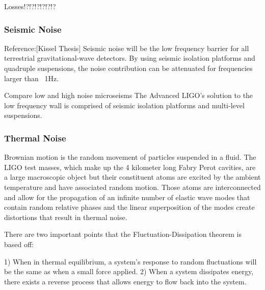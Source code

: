 		Losses!?!?!?!?!?!?
		
		\subsubsection{Seismic Noise}
		Reference:[Kissel Thesis]
		Seismic noise will be the low frequency barrier for all terrestrial gravitational-wave detectors.  By using seismic isolation platforms and quadruple suspensions, the noise contribution can be attenuated for frequencies larger than ~1Hz.
		
		Compare low and high noise microseisms
		\cite{BlairBook}
		The Advanced LIGO's solution to the low frequency wall is comprised of seismic isolation platforms and multi-level suspensions.
		
		\subsubsection{Thermal Noise}
		Brownian motion \cite{brownian_einstein} is the random movement of particles suspended in a fluid.  The LIGO test masses, which make up the 4 kilometer long Fabry Perot cavities, are a large macroscopic object but their constituent atoms are excited by the ambient temperature and have associated random motion. Those atoms are interconnected and allow for the propagation of an infinite number of elastic wave modes that contain random relative phases and the linear superposition of the modes create distortions that result in thermal noise.	
		
		There are two important points that the Fluctuation-Dissipation theorem is based off:
		
		1) When in thermal equilibrium, a system's response to random fluctuations will be the same as when a small force applied.
		2) When a system dissipates energy, there exists a reverse process that allows energy to flow back into the system.
		
